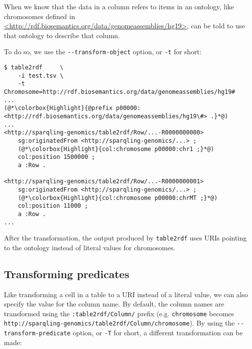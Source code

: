   \begin{sloppypar}
  When we know that the data in a column refers to items in an ontology, like
  chromosomes defined in
  \href{http://rdf.biosemantics.org/data/genomeassemblies/hg19}%
  {<http://rdf.biosemantics.org/data/genomeassemblies/hg19>}, 
  can be told to use that ontology to describe that column.
  \end{sloppypar}

  To do so, we use the \texttt{-{}-transform-object} option, or \texttt{-t}
  for short:

\begin{siderules}
\begin{lstlisting}
$ table2rdf     \
    -i test.tsv \
    -t Chromosome=http://rdf.biosemantics.org/data/genomeassemblies/hg19#
...
(@*\colorbox{Highlight}{@prefix p00000: <http://rdf.biosemantics.org/data/genomeassemblies/hg19\#> .}*@)
...
<http://sparqling-genomics/table2rdf/Row/...-R0000000000>
    sg:originatedFrom <http://sparqling-genomics/...> ;
    (@*\colorbox{Highlight}{col:chromosome p00000:chr1 ;}*@)
    col:position 1500000 ;
    a :Row .

<http://sparqling-genomics/table2rdf/Row/...-R0000000001>
    sg:originatedFrom <http://sparqling-genomics/...> ;
    (@*\colorbox{Highlight}{col:chromosome p00000:chrMT ;}*@)
    col:position 11000 ;
    a :Row .
...
\end{lstlisting}
\end{siderules}

  After the transformation, the output produced by \texttt{table2rdf} uses
  URIs pointing to the ontology instead of literal values for chromosomes.

\subsection{Transforming predicates}

  Like transforming a cell in a table to a URI instead of a literal value,
  we can also specify the value for the column name.  By default, the column
  names are transformed using the \texttt{:table2rdf/Column/} prefix (e.g.
  \texttt{chromosome} becomes
  \texttt{http://sparqling-genomics/table2rdf/Column/chromosome}).  By using
  the \texttt{-{}-transform-predicate} option, or \texttt{-T} for short, a
  different transformation can be made:

